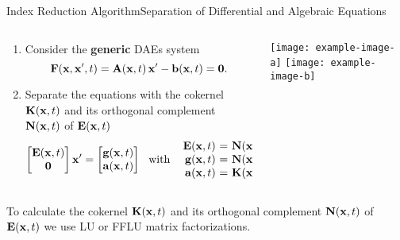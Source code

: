 \begin{frame}{Index Reduction Algorithm}{Separation of Differential and Algebraic Equations}
  \begin{columns}
    \begin{column}[c]{0.6\textwidth}
      \begin{enumerate}
        \item Consider the \textbf{generic} \acp{DAE} system
        \begin{equation*}
          \mathbf{F}(\mathbf{x}, \mathbf{x}^\prime, t) = \mathbf{A}(\mathbf{x}, t) \, \mathbf{x}^\prime - \mathbf{b}(\mathbf{x}, t) = \mathbf{0} \text{.}
        \end{equation*}
        \item Separate the equations with the cokernel $\mathbf{K}(\mathbf{x}, t)$ and its orthogonal complement $\mathbf{N}(\mathbf{x}, t)$ of $\mathbf{E}(\mathbf{x}, t)$%
        \begin{equation*}
          \begin{bmatrix} \mE \\ \m{0} \end{bmatrix} \mxp = \begin{bmatrix} \mg \\ \ma \end{bmatrix}
          ~~ \text{with} ~~
          \begin{array}{r@{~}c@{~}l}
            \mE &=& \mN \, \mA \text{,} \\
            \mg &=& \mN \, \mb \text{,} \\
            \ma &=& \mK \, \mb \text{.}
          \end{array}
        \end{equation*}
      \end{enumerate}
    \end{column}
    \begin{column}[c]{0.4\textwidth}
      \texttt{[image: example-image-a]}
      \texttt{[image: example-image-b]}
    \end{column}
  \end{columns}
  \begin{bbox}
    To calculate the cokernel $\mathbf{K}(\mathbf{x}, t)$ and its orthogonal complement $\mathbf{N}(\mathbf{x}, t)$ of $\mathbf{E}(\mathbf{x}, t)$ we use \ac{LU} or \ac{FFLU} matrix factorizations.
  \end{bbox}
\end{frame}

